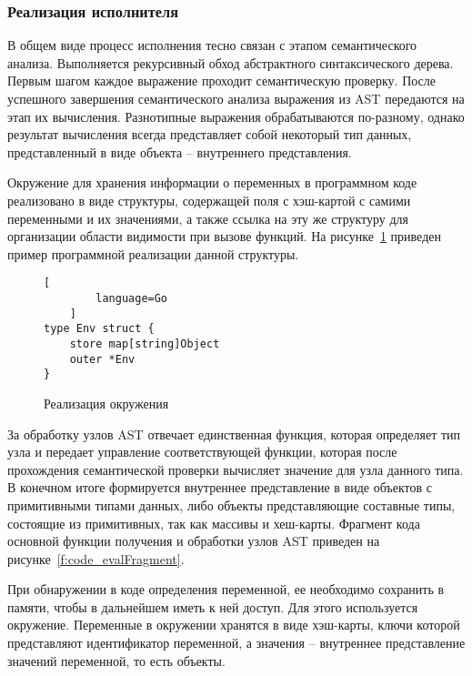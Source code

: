 \subsubsection{Реализация исполнителя}

В общем виде процесс исполнения тесно связан с этапом семантического анализа.
Выполняется рекурсивный обход абстрактного синтаксического дерева.
Первым шагом каждое выражение проходит семантическую проверку.
После успешного завершения семантического анализа выражения из AST передаются на этап их вычисления.
Разнотипные выражения обрабатываются по-разному, однако результат вычисления всегда представляет собой некоторый тип данных, представленный в виде объекта -- внутреннего представления.

Окружение для хранения информации о переменных в программном коде реализовано в виде структуры,
содержащей поля с хэш-картой с самими переменными и их значениями, а также ссылка на эту же структуру для организации области видимости при вызове функций.
На рисунке~\ref{f:code_envStruct} приведен пример программной реализации данной структуры.

\begin{figure}[ht]
	\centering
	\vspace{\toppaddingoffigure}
	\begin{lstlisting}[
        language=Go
    ]
type Env struct {
    store map[string]Object
    outer *Env
}
\end{lstlisting}
	\caption{Реализация окружения}
	\label{f:code_envStruct}
\end{figure}

За обработку узлов AST отвечает единственная функция, которая определяет тип узла и передает управление соответствующей функции,
которая после прохождения семантической проверки вычисляет значение для узла данного типа.
В конечном итоге формируется внутреннее представление в виде объектов с примитивными типами данных, либо объекты представляющие составные типы, состоящие из примитивных, так как массивы и хеш-карты.
Фрагмент кода основной функции получения и обработки узлов AST приведен на рисунке~\ref{f:code_evalFragment}.

При обнаружении в коде определения переменной, ее необходимо сохранить в памяти, чтобы в дальнейшем иметь к ней доступ.
Для этого используется окружение.
Переменные в окружении хранятся в виде хэш-карты, ключи которой представляют идентификатор переменной, а значения – внутреннее представление значений переменной, то есть объекты.

